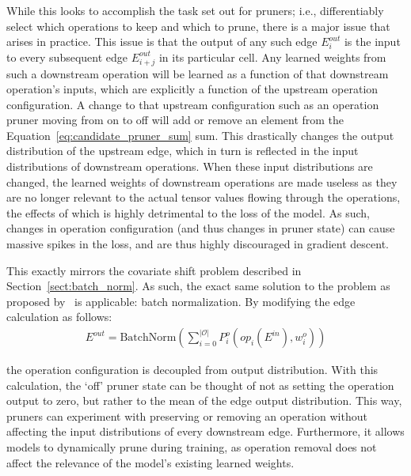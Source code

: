 \noindent While this looks to accomplish the task set out for pruners; i.e., differentiably select which operations
to keep and which to prune, there is a major issue that arises in practice. This issue is that the output of any such edge
$E^{out}_i$ is the input to every subsequent edge $E^{out}_{i+j}$ in its particular cell. Any learned weights from such
a downstream operation will be learned as a function of that downstream operation's inputs, which are explicitly a function
of the upstream operation configuration. A change to that upstream configuration such as an operation pruner moving from
on to off will add or remove an element from the Equation~\ref{eq:candidate_pruner_sum} sum. This drastically
changes the output distribution of the upstream edge, which in turn is reflected in the input distributions of downstream
operations. When these input distributions are changed, the learned weights of downstream operations are made useless as
they are no longer relevant to the actual tensor values flowing through the operations, the effects of which is highly detrimental
to the loss of the model. As such, changes in operation configuration (and thus changes in pruner state) can cause
	massive spikes in the loss, and are thus highly discouraged in gradient descent.

This exactly mirrors the covariate shift problem described in Section~\ref{sect:batch_norm}. As such, the
exact same solution to the problem as proposed by~\cite{ioffe2015} is applicable: batch normalization. By modifying
the edge calculation as follows:
\begin{align}
	E^{out} = \text{BatchNorm}\left( \sum_{i=0}^{\mathcal{|O|}} P^o_i (op_i(E^{in}), w^o_i) \right) \label{eq:candidate_pruner_sum_bn}
\end{align}

\noindent the operation configuration is decoupled from output distribution. With this calculation, the
`off' pruner state can be thought of not as setting the operation output to zero, but rather to the mean of the edge output distribution.
This way, pruners can experiment with preserving or removing an operation without affecting the input distributions
	of every downstream edge. Furthermore, it
allows models to dynamically prune during training, as operation removal does not affect the relevance of the
model's existing learned weights.

